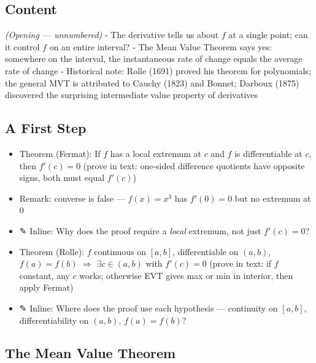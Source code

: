 \documentclass[
  10pt,
  letterpaper,
]{scrbook}
\providecommand{\tightlist}{%
  \setlength{\itemsep}{0pt}\setlength{\parskip}{0pt}}
\begin{document}
\subsection{Content}\label{content-30}

\emph{(Opening --- unnumbered)} - The derivative tells us about \(f\) at
a single point; can it control \(f\) on an entire interval? - The Mean
Value Theorem says yes: somewhere on the interval, the instantaneous
rate of change equals the average rate of change - Historical note:
Rolle (1691) proved his theorem for polynomials; the general MVT is
attributed to Cauchy (1823) and Bonnet; Darboux (1875) discovered the
surprising intermediate value property of derivatives

\subsection{A First Step}\label{a-first-step}

\begin{itemize}
\tightlist
\item
  Theorem (Fermat): If \(f\) has a local extremum at \(c\) and \(f\) is
  differentiable at \(c\), then \(f'(c) = 0\) (prove in text: one-sided
  difference quotients have opposite signs, both must equal \(f'(c)\))
\item
  Remark: converse is false --- \(f(x) = x^3\) has \(f'(0) = 0\) but no
  extremum at \(0\)
\item
  ✎ Inline: Why does the proof require a \emph{local} extremum, not just
  \(f'(c) = 0\)?
\item
  Theorem (Rolle): \(f\) continuous on \([a,b]\), differentiable on
  \((a,b)\), \(f(a) = f(b)\) \(\Longrightarrow\) \(\exists c \in (a,b)\)
  with \(f'(c) = 0\) (prove in text: if \(f\) constant, any \(c\) works;
  otherwise EVT gives max or min in interior, then apply Fermat)
\item
  ✎ Inline: Where does the proof use each hypothesis --- continuity on
  \([a,b]\), differentiability on \((a,b)\), \(f(a) = f(b)\)?
\end{itemize}

\subsection{The Mean Value Theorem}\label{the-mean-value-theorem-1}
\end{document}
